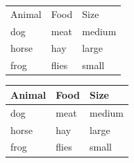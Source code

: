 \documentclass{ctexart}
\begin{document}
\begin{tabular}{lll}
    Animal & Food  & Size   \\
    dog    & meat  & medium \\
    horse  & hay   & large  \\
    frog   & flies & small  \\
  \end{tabular}



  \begin{tabular}{lll}
    \toprule
    Animal & Food  & Size   \\
    \midrule
    dog    & meat  & medium \\
    horse  & hay   & large  \\
    frog   & flies & small  \\
    \bottomrule
  \end{tabular}
\end{document}
